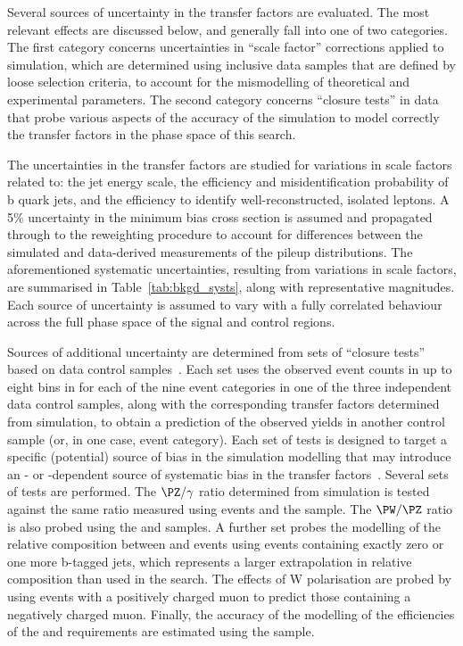Several sources of uncertainty in the transfer factors are evaluated.
The most relevant effects are discussed below, and generally fall into
one of two categories. The first category concerns uncertainties in
``scale factor'' corrections applied to simulation, which are
determined using inclusive data samples that are defined by loose
selection criteria, to account for the mismodelling of theoretical and
experimental parameters. The second category concerns ``closure
tests'' in data that probe various aspects of the accuracy of the
simulation to model correctly the transfer factors in the phase space
of this search.

The uncertainties in the transfer factors are studied for variations
in scale factors related to: the jet energy scale, the efficiency and
misidentification probability of b quark jets, and the efficiency to
identify well-reconstructed, isolated leptons. A 5\% uncertainty in
the minimum bias cross section is assumed and propagated through to
the reweighting procedure to account for differences between the
simulated and data-derived measurements of the pileup distributions.
The aforementioned systematic uncertainties, resulting from variations
in scale factors, are summarised in Table~\ref{tab:bkgd_systs}, along
with representative magnitudes.  Each source of uncertainty is assumed
to vary with a fully correlated behaviour across the full phase space
of the signal and control regions.

Sources of additional uncertainty are determined from sets of
``closure tests'' based on data control
samples~\cite{RA1Paper2012}. Each set uses the observed event counts
in up to eight bins in \scalht for each of the nine \njet event
categories in one of the three independent data control samples, along
with the corresponding transfer factors determined from simulation, to
obtain a prediction of the observed yields in another control sample
(or, in one case, \nb event category). 
Each set of tests is designed to target a specific (potential) source
of bias in the simulation modelling that may introduce an \njet- or
\scalht-dependent source of systematic bias in the transfer
factors~\cite{RA1Paper2012}. Several sets of tests are performed. The
$\PZ/\gamma$ ratio determined from simulation is tested against the
same ratio measured using \zmmj events and the \gj sample. The
$\PW/\PZ$ ratio is also probed using the \mj and \mmj samples. A
further set probes the modelling of the relative composition between
\wlj and \ttbar events using \mj events containing exactly zero or one
more b-tagged jets, which represents a larger extrapolation in
relative composition than used in the search.  The effects of W
polarisation are probed by using \mj events with a positively charged
muon to predict those containing a negatively charged muon. Finally,
the accuracy of the modelling of the efficiencies of the \alphat and
\bdphi requirements are estimated using the \mj sample.

